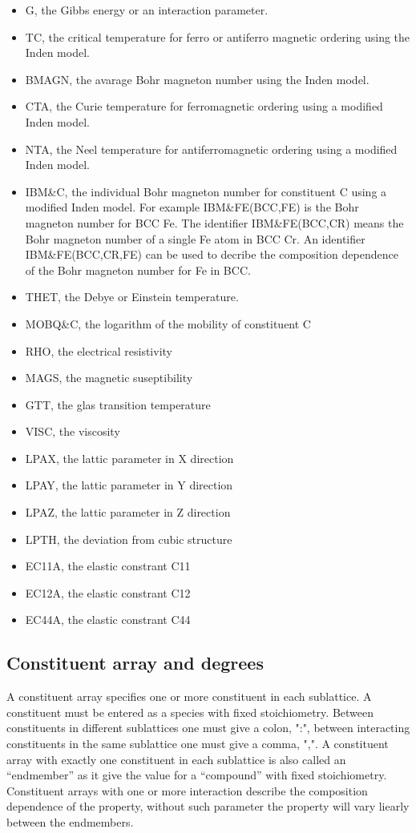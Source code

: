\documentclass[12pt]{article}
\begin{document}
\begin{itemize}
\item G, the Gibbs energy or an interaction parameter.
\item TC, the critical temperature for ferro or antiferro magnetic
ordering using the Inden model.
\item BMAGN, the avarage Bohr magneton number using the Inden model.
\item CTA, the Curie temperature for ferromagnetic ordering using
a modified Inden model.
\item NTA, the Neel temperature for antiferromagnetic ordering using a
modified Inden model.
\item IBM\&C, the individual Bohr magneton number for constituent C
using a modified Inden model.  For example IBM\&FE(BCC,FE) is the Bohr
magneton number for BCC Fe.  The identifier IBM\&FE(BCC,CR) means the
Bohr magneton number of a single Fe atom in BCC Cr.  An identifier
IBM\&FE(BCC,CR,FE) can be used to decribe the composition dependence of
the Bohr magneton number for Fe in BCC.
\item THET, the Debye or Einstein temperature.
\item MOBQ\&C, the logarithm of the mobility of constituent C
\item RHO, the electrical resistivity
\item MAGS, the magnetic suseptibility
\item GTT, the glas transition temperature
\item VISC, the viscosity
\item LPAX, the lattic parameter in X direction
\item LPAY, the lattic parameter in Y direction
\item LPAZ, the lattic parameter in Z direction
\item LPTH, the deviation from cubic structure
\item EC11A, the elastic constrant C11
\item EC12A, the elastic constrant C12
\item EC44A, the elastic constrant C44
\end{itemize}

\subsection{Constituent array and degrees}

A constituent array specifies one or more constituent in each
sublattice.  A constituent must be entered as a species with fixed
stoichiometry.  Between constituents in different sublattices one must
give a colon, ":", between interacting constituents in the same
sublattice one must give a comma, ",".  A constituent array with
exactly one constituent in each sublattice is also called an
``endmember'' as it give the value for a ``compound'' with fixed
stoichiometry.  Constituent arrays with one or more interaction
describe the composition dependence of the property, without such
parameter the property will vary liearly between the endmembers.
\end{document}
